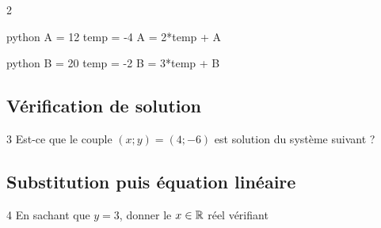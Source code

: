 \begin{frame}[fragile]{2\vspace{-32pt}}	
\vspace{-5pt}
\begin{center}
\begin{minipage}{0.4\textwidth}
\begin{mintedbox}{python}
A = 12
temp = -4
A = 2*temp + A
\end{mintedbox}
\end{minipage}
\hspace{20pt}
\begin{minipage}{0.4\textwidth}
\begin{mintedbox}{python}
B = 20
temp = -2
B = 3*temp + B
\end{mintedbox}
\end{minipage}
\end{center}

\end{frame}



\subsection{Vérification de solution}

\begin{frame}{3\vspace{-32pt}}
	\vfill 
	Est-ce que le couple $(x;y) = (4;-6)$ est solution du système suivant ?
\end{frame}


\subsection{Substitution puis équation linéaire}

\begin{frame}{4\vspace{-32pt}}	
	En sachant que $y=3$, donner le $x\in\mathbb{R}$ réel vérifiant

\end{frame}

